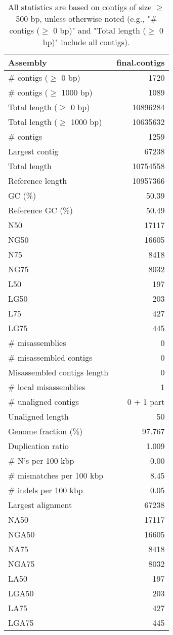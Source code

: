 \documentclass[12pt,a4paper]{article}
\begin{document}
\begin{table}[ht]
\begin{center}
\caption{All statistics are based on contigs of size $\geq$ 500 bp, unless otherwise noted (e.g., "\# contigs ($\geq$ 0 bp)" and "Total length ($\geq$ 0 bp)" include all contigs).}
\begin{tabular}{|l*{1}{|r}|}
\hline
Assembly & final.contigs \\ \hline
\# contigs ($\geq$ 0 bp) & 1720 \\ \hline
\# contigs ($\geq$ 1000 bp) & 1089 \\ \hline
Total length ($\geq$ 0 bp) & 10896284 \\ \hline
Total length ($\geq$ 1000 bp) & 10635632 \\ \hline
\# contigs & 1259 \\ \hline
Largest contig & 67238 \\ \hline
Total length & 10754558 \\ \hline
Reference length & 10957366 \\ \hline
GC (\%) & 50.39 \\ \hline
Reference GC (\%) & 50.49 \\ \hline
N50 & 17117 \\ \hline
NG50 & 16605 \\ \hline
N75 & 8418 \\ \hline
NG75 & 8032 \\ \hline
L50 & 197 \\ \hline
LG50 & 203 \\ \hline
L75 & 427 \\ \hline
LG75 & 445 \\ \hline
\# misassemblies & 0 \\ \hline
\# misassembled contigs & 0 \\ \hline
Misassembled contigs length & 0 \\ \hline
\# local misassemblies & 1 \\ \hline
\# unaligned contigs & 0 + 1 part \\ \hline
Unaligned length & 50 \\ \hline
Genome fraction (\%) & 97.767 \\ \hline
Duplication ratio & 1.009 \\ \hline
\# N's per 100 kbp & 0.00 \\ \hline
\# mismatches per 100 kbp & 8.45 \\ \hline
\# indels per 100 kbp & 0.05 \\ \hline
Largest alignment & 67238 \\ \hline
NA50 & 17117 \\ \hline
NGA50 & 16605 \\ \hline
NA75 & 8418 \\ \hline
NGA75 & 8032 \\ \hline
LA50 & 197 \\ \hline
LGA50 & 203 \\ \hline
LA75 & 427 \\ \hline
LGA75 & 445 \\ \hline
\end{tabular}
\end{center}
\end{table}
\end{document}

